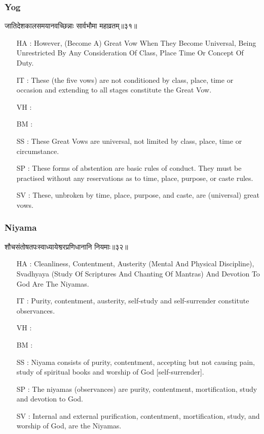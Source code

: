 \begin{frame}[fragile]\frametitle{Yog}
\begin{sanskrit}
जातिदेशकालसमयानवच्छिन्नाः सार्वभौमा महाव्रतम्॥३१॥
\end{sanskrit}

	\begin{itemize}
	\item [HA]: However, (Become A) Great Vow When They Become Universal, Being Unrestricted By Any Consideration Of Class, Place Time Or Concept Of Duty.
	\item [IT]: These (the five vows) are not conditioned by class, place, time or occasion and extending to all stages constitute the Great Vow.
	\item [VH]: 
	\item [BM]: 
	\item [SS]: These Great Vows are universal, not limited by class, place, time or circumstance.
	\item [SP]: These forms of abstention are basic rules of conduct. They must be practised without any reservations as to time, place, purpose, or caste rules.
	\item [SV]: These, unbroken by time, place, purpose, and caste, are (universal) great vows. 
	\end{itemize}
\end{frame}



\begin{frame}[fragile]\frametitle{Niyama}
\begin{sanskrit}
शौचसंतोषतपःस्वाध्यायेश्वरप्रणिधानानि नियमाः॥३२॥
\end{sanskrit}

	\begin{itemize}
	\item [HA]: Cleanliness, Contentment, Austerity (Mental And Physical Discipline), Svadhyaya (Study Of Scriptures And Chanting Of Mantras) And Devotion To God Are The Niyamas.
	\item [IT]: Purity, contentment, austerity, self-study and self-surrender constitute observances.
	\item [VH]: 
	\item [BM]: 
	\item [SS]: Niyama consists of purity, contentment, accepting but not causing pain, study of spiritual books and worship of God [self-surrender].
	\item [SP]: The niyamas (observances) are purity, contentment, mortification, study and devotion to God.
	\item [SV]: Internal and external purification, contentment, mortification, study, and worship of God, are the Niyamas. 
	\end{itemize}
\end{frame}



